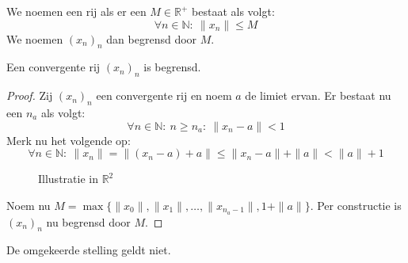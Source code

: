 \documentclass[main.tex]{subfiles}
\begin{document}
\begin{de}
  We noemen een rij  als er een $M \in \mathbb{R}^{+}$ bestaat als volgt:
  \[ \forall n \in \mathbb{N}:\ \|x_{n}\| \le M \]
  We noemen $(x_{n})_{n}$ dan begrensd door $M$.
\end{de}

\begin{st}
  \label{st:in-rp-convergent-dan-begrensd}
  Een convergente rij $(x_{n})_{n}$ is begrensd.

  \begin{proof}
    Zij $(x_{n})_{n}$ een convergente rij en noem $a$ de limiet ervan.
    Er bestaat nu een $n_{a}$ als volgt:
    \[ \forall n \in \mathbb{N}:\ n \ge n_{a}:\ \|x_{n}-a\| < 1 \]
    Merk nu het volgende op:
    \[ \forall n \in \mathbb{N}:\ \|x_{n}\| = \|(x_{n}-a) + a\| \le \|x_{n}-a\| + \|a\| < \|a\|+1 \]
    \begin{figure}[H]
      \centering
      \caption{Illustratie in $\mathbb{R}^{2}$}
    \end{figure}
    Noem nu $M = \max \{ \|x_{0}\|, \|x_{1}\|, \dotsc, \|x_{n_{a}-1}\|, 1+\|a\|\}$.
    Per constructie is $(x_{n})_{n}$ nu begrensd door $M$.
  \end{proof}
\end{st}

\begin{gst}
  De omgekeerde stelling geldt niet.
\end{gst}
\end{document}
